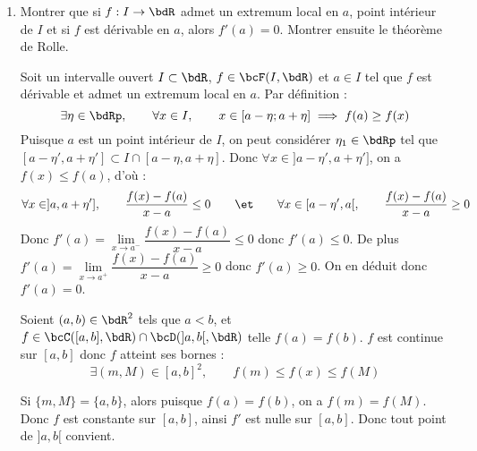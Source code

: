 \documentclass[a4paper,french,bookmarks]{article}
\begin{document}
\begin{enumerate}
    \item Montrer que si $f : I \to \bdR$ admet un extremum local en $a$, point intérieur de $I$ et si $f$ est dérivable en $a$, alors $f'(a) = 0$. Montrer ensuite le théorème de Rolle.
    
    \noafter
	\nobefore
	\begin{nproof}
        Soit un intervalle ouvert $I \subset \bdR$, $f \in \bcF(I, \bdR)$ et $a \in I$ tel que $f$ est dérivable et admet un extremum local en $a$. Par définition :
        \[ \exists \eta \in \bdRp,\qquad \forall x \in I,\qquad x \in [a - \eta; a + \eta] \implies f(a) \geq f(x)\]
        Puisque $a$ est un point intérieur de $I$, on peut considérer $\eta_1 \in \bdRp$ tel que $[ a - \eta', a + \eta' ] \subset I \cap [ a - \eta, a + \eta ]$. Donc $\forall x \in ]a - \eta', a + \eta']$, on a $f(x) \leq f(a)$, d'où :
        \[ \forall x \in ]a, a + \eta'],\qquad \dfrac{f(x) - f(a)}{x - a} \leq 0 \qquad\et\qquad \forall x \in [a - \eta', a[,\qquad  \dfrac{f(x) - f(a)}{x - a} \geq 0\]
        Donc $f'(a) = \lim\limits_{x \to a^-} \dfrac{f(x) - f(a)}{x - a} \leq 0$ donc $f'(a) \leq 0$. De plus $f'(a) = \lim\limits_{x \to a^+} \dfrac{f(x) - f(a)}{x - a} \geq 0$ donc $f'(a) \geq 0$. On en déduit donc $f'(a) = 0$.
	\end{nproof}
	\boxans{
        \begin{theorem}{Théorème de Rolle}{rolle}
            Soient $(a, b) \in \bdR^2$ tels que $a < b$, et $f \in \bcC([a, b], \bdR) \cap \bcD(]a, b[, \bdR)$. On a :
            \[ \hg{f(a) = f(b)\implies \exists c \in ]a, b[,\qquad f'(c) = 0}\]
        \end{theorem}
    }
	\yesafter
	\begin{nproof}
        Soient $(a, b) \in \bdR^2$ tels que $a < b$, et $f \in \bcC([a, b], \bdR) \cap \bcD(]a, b[, \bdR)$ telle $f(a) = f(b)$. $f$ est continue sur $[a, b]$ donc $f$ atteint ses bornes :
        \[ \exists (m, M) \in [a, b]^2,\qquad f(m) \leq f(x) \leq f(M)\]
        \begin{enumerate}
            \ithand Si $\{m,M\} = \{a, b\}$, alors puisque $f(a) = f(b)$, on a $f(m) = f(M)$. Donc $f$ est constante sur $[a, b]$, ainsi $f'$ est nulle sur $[a, b]$. Donc tout point de $]a, b[$ convient.


\end{enumerate}
\end{nproof}
\end{enumerate}
\end{document}
